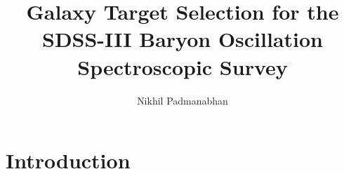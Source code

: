 \documentclass[iop,apj]{emulateapj}
\begin{document}
\topmargin-1cm
\linenumbers


\title{Galaxy Target Selection for the SDSS-III Baryon Oscillation Spectroscopic
        Survey}


\author{Nikhil Padmanabhan}




\begin{abstract}


\end{abstract}



\section{Introduction}
\end{document}
